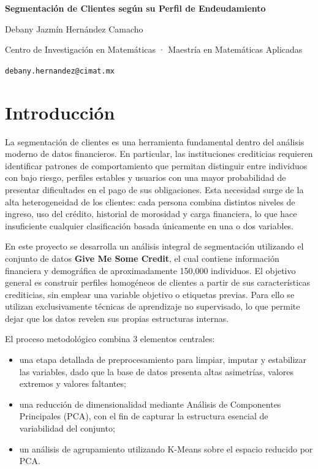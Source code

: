 \documentclass[a4paper,12pt]{article}
\begin{document}
\begin{center}
\vspace*{0.5em}
{\LARGE \textbf{\color{Accent}Segmentación de Clientes según su Perfil de Endeudamiento}\par}
\vspace{0.5em}
{\normalsize Debany Jazmín Hernández Camacho \par}
\vspace{0.25em}
{\footnotesize Centro de Investigación en Matemáticas \;·\; Maestría en Matemáticas Aplicadas \par}
{\footnotesize \texttt{debany.hernandez@cimat.mx} \par}
\vspace{0.8em}
\end{center}

\section{Introducción} La segmentación de clientes es una herramienta fundamental dentro del análisis moderno de datos 
financieros. En particular, las instituciones crediticias requieren identificar patrones de comportamiento que permitan 
distinguir entre individuos con bajo riesgo, perfiles estables y usuarios con una mayor probabilidad de presentar dificultades 
en el pago de sus obligaciones. Esta necesidad surge de la alta heterogeneidad de los clientes: cada persona combina distintos 
niveles de ingreso, uso del crédito, historial de morosidad y carga financiera, lo que hace insuficiente cualquier clasificación 
basada únicamente en una o dos variables. 

En este proyecto se desarrolla un análisis integral de segmentación utilizando el conjunto de datos \textbf{Give Me Some Credit}, 
el cual contiene información financiera y demográfica de aproximadamente 150,000 individuos. El objetivo general es construir 
perfiles homogéneos de clientes a partir de sus características crediticias, sin emplear una variable objetivo o etiquetas previas. 
Para ello se utilizan exclusivamente técnicas de aprendizaje no supervisado, lo que permite dejar que los datos revelen sus 
propias estructuras internas. 

El proceso metodológico combina 3 elementos centrales: 
\begin{itemize}[label=\textcolor{Accent}{$\diamond$}]
  \item una etapa detallada de preprocesamiento para limpiar, imputar y estabilizar las variables, dado que la base de datos 
  presenta altas asimetrías, valores extremos y valores faltantes; 
  \item una reducción de dimensionalidad mediante Análisis de Componentes Principales (PCA), con el fin de capturar la estructura 
  esencial de variabilidad del conjunto; 
  \item un análisis de agrupamiento utilizando K-Means sobre el espacio reducido por PCA. 
\end{itemize}
\end{document}
